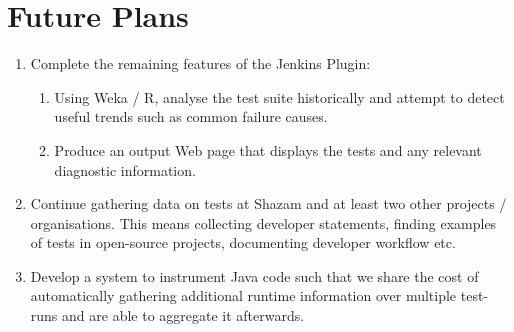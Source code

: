 \newpage

\section{Future Plans}

\begin{enumerate}
	\item{
		Complete the remaining features of the Jenkins Plugin:
	}
	\begin{enumerate}
		\item{
			Using Weka / R, analyse the test suite historically and attempt to detect useful trends such as common failure causes.
		}
		\item{
			Produce an output Web page that displays the \flaky{} tests and any relevant diagnostic information.
		}
	\end{enumerate}
	\item{
		Continue gathering data on \flaky{} tests at Shazam and at least two other projects / organisations. This means collecting developer statements, finding examples of \flaky{} tests in open-source projects, documenting developer workflow etc.
	}
	\item{
		Develop a system to instrument Java code such that we share the cost of automatically gathering additional runtime information over multiple test-runs and are able to aggregate it afterwards.
	}
\end{enumerate}

\newpage

\setcounter{section}{\value{oldSectionCounter}}
\setcounter{page}{\value{oldPageCounter}}